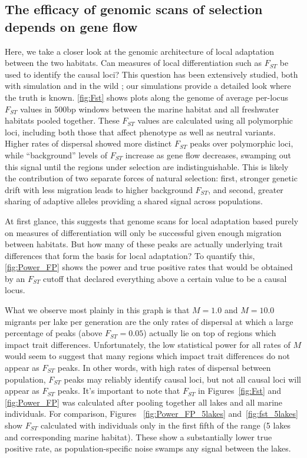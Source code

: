 \documentclass{article}
\begin{document}
\subsection*{The efficacy of genomic scans of selection depends on gene flow}

Here, we take a closer look at the genomic architecture of local adaptation between the two habitats. 
Can measures of local differentiation such as $F_{ST}$ be used to identify the causal loci? 
This question has been extensively studied,
both with simulation \citep[e.g.,][]{southcott2017neutral,lotterhos2015relative}
and in the wild \citep[reviewed in][]{harrison2016heterogeneous,hoban2016finding};
our simulations provide a detailed look where the truth is known.
\autoref{fig:Fst} shows plots along the genome of average per-locus $F_{ST}$ values in 500bp windows between the marine habitat and all freshwater habitats pooled together. 
These $F_{ST}$ values are calculated using all polymorphic loci,
including both those that affect phenotype as well as neutral variants. 
Higher rates of dispersal showed more distinct $F_{ST}$ peaks over polymorphic loci, while ``background'' levels of $F_{ST}$ increase as gene flow decreases, swamping out this signal until the regions under selection are indistinguishable. This is likely the contribution of two separate forces of natural selection: 
first, stronger genetic drift with less migration leads to higher background $F_{ST}$, and second, greater sharing of adaptive alleles providing a shared signal across populations.

At first glance, this suggests that genome scans for local adaptation based purely on measures of differentiation will only be successful given enough migration between habitats. 
But how many of these peaks are actually underlying trait differences that form the basis for local adaptation? 
To quantify this, \autoref{fig:Power_FP} shows the power and true positive rates that would be obtained by an $F_{ST}$ cutoff that declared everything above a certain value to be a causal locus. 

What we observe most plainly in this graph is that $M = 1.0$ and $M = 10.0$ migrants per lake per generation 
are the only rates of dispersal at which a large percentage of peaks (above $F_{ST} = 0.05$) 
actually lie on top of regions which impact trait differences.
Unfortunately, the low statistical power for all rates of $M$ would seem to suggest that many regions which impact trait differences do not appear as $F_{ST}$ peaks. 
In other words, with high rates of dispersal between population, $F_{ST}$ peaks may reliably identify causal loci, 
but not all causal loci will appear as $F_{ST}$ peaks.
It's important to note that $F_{ST}$ in Figures~\ref{fig:Fst} and \ref{fig:Power_FP} was calculated after pooling together all lakes and all marine individuals.
For comparison, Figures~ \ref{fig:Power_FP_5lakes} and~\ref{fig:fst_5lakes} show $F_{ST}$ calculated with individuals only in the first fifth of the range (5 lakes and corresponding marine habitat).
These show a substantially lower true positive rate, as population-specific noise swamps any signal between the lakes.
\end{document}
